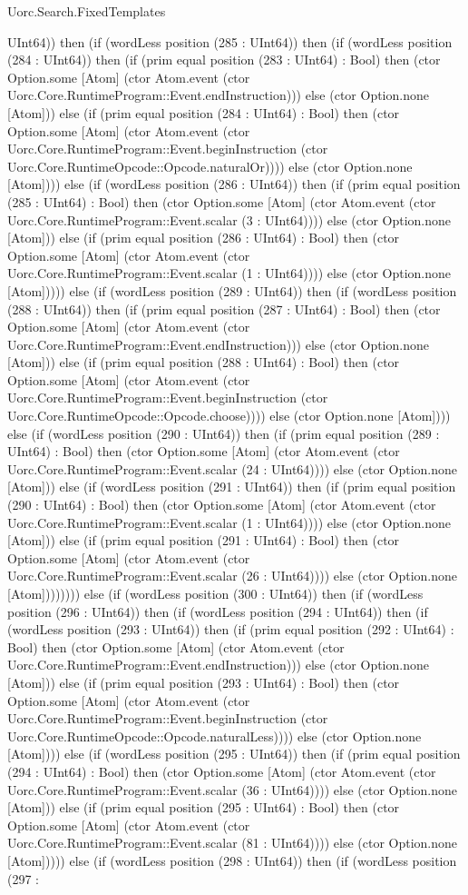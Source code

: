 \begin{lexlean}{Uorc.Search.FixedTemplates}
\begin{semanticmodule}
{UInt64)) then (if (wordLess position (285 : UInt64)) then (if (wordLess position (284 : UInt64)) then (if (prim equal position (283 : UInt64) : Bool) then (ctor Option.some [Atom] (ctor Atom.event (ctor Uorc.Core.RuntimeProgram::Event.endInstruction))) else (ctor Option.none [Atom])) else (if (prim equal position (284 : UInt64) : Bool) then (ctor Option.some [Atom] (ctor Atom.event (ctor Uorc.Core.RuntimeProgram::Event.beginInstruction (ctor Uorc.Core.RuntimeOpcode::Opcode.naturalOr)))) else (ctor Option.none [Atom]))) else (if (wordLess position (286 : UInt64)) then (if (prim equal position (285 : UInt64) : Bool) then (ctor Option.some [Atom] (ctor Atom.event (ctor Uorc.Core.RuntimeProgram::Event.scalar (3 : UInt64)))) else (ctor Option.none [Atom])) else (if (prim equal position (286 : UInt64) : Bool) then (ctor Option.some [Atom] (ctor Atom.event (ctor Uorc.Core.RuntimeProgram::Event.scalar (1 : UInt64)))) else (ctor Option.none [Atom])))) else (if (wordLess position (289 : UInt64)) then (if (wordLess position (288 : UInt64)) then (if (prim equal position (287 : UInt64) : Bool) then (ctor Option.some [Atom] (ctor Atom.event (ctor Uorc.Core.RuntimeProgram::Event.endInstruction))) else (ctor Option.none [Atom])) else (if (prim equal position (288 : UInt64) : Bool) then (ctor Option.some [Atom] (ctor Atom.event (ctor Uorc.Core.RuntimeProgram::Event.beginInstruction (ctor Uorc.Core.RuntimeOpcode::Opcode.choose)))) else (ctor Option.none [Atom]))) else (if (wordLess position (290 : UInt64)) then (if (prim equal position (289 : UInt64) : Bool) then (ctor Option.some [Atom] (ctor Atom.event (ctor Uorc.Core.RuntimeProgram::Event.scalar (24 : UInt64)))) else (ctor Option.none [Atom])) else (if (wordLess position (291 : UInt64)) then (if (prim equal position (290 : UInt64) : Bool) then (ctor Option.some [Atom] (ctor Atom.event (ctor Uorc.Core.RuntimeProgram::Event.scalar (1 : UInt64)))) else (ctor Option.none [Atom])) else (if (prim equal position (291 : UInt64) : Bool) then (ctor Option.some [Atom] (ctor Atom.event (ctor Uorc.Core.RuntimeProgram::Event.scalar (26 : UInt64)))) else (ctor Option.none [Atom]))))))) else (if (wordLess position (300 : UInt64)) then (if (wordLess position (296 : UInt64)) then (if (wordLess position (294 : UInt64)) then (if (wordLess position (293 : UInt64)) then (if (prim equal position (292 : UInt64) : Bool) then (ctor Option.some [Atom] (ctor Atom.event (ctor Uorc.Core.RuntimeProgram::Event.endInstruction))) else (ctor Option.none [Atom])) else (if (prim equal position (293 : UInt64) : Bool) then (ctor Option.some [Atom] (ctor Atom.event (ctor Uorc.Core.RuntimeProgram::Event.beginInstruction (ctor Uorc.Core.RuntimeOpcode::Opcode.naturalLess)))) else (ctor Option.none [Atom]))) else (if (wordLess position (295 : UInt64)) then (if (prim equal position (294 : UInt64) : Bool) then (ctor Option.some [Atom] (ctor Atom.event (ctor Uorc.Core.RuntimeProgram::Event.scalar (36 : UInt64)))) else (ctor Option.none [Atom])) else (if (prim equal position (295 : UInt64) : Bool) then (ctor Option.some [Atom] (ctor Atom.event (ctor Uorc.Core.RuntimeProgram::Event.scalar (81 : UInt64)))) else (ctor Option.none [Atom])))) else (if (wordLess position (298 : UInt64)) then (if (wordLess position (297 : }
\end{semanticmodule}
\end{lexlean}
